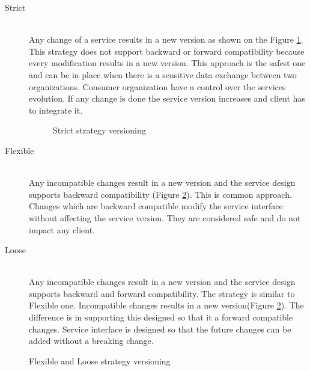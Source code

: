 \begin{description}
  \item[Strict]  \hfill \\
  Any change of a service results in a new version as shown on the Figure \ref{fig:strict-strategy}. This strategy does not support backward or forward compatibility because every modification results in a new version. This approach is the safest one and can be in place when there is a sensitive data exchange between two organizations. Consumer organization have a control over the services evolution. If any change is done the service version increases and client has to integrate it. 
    
\begin{figure}[htp] 
\caption{Strict strategy versioning}
\label{fig:strict-strategy}
\end{figure} 

  \item[Flexible] \hfill \\
  Any incompatible changes result in a new version and the service design supports backward compatibility (Figure \ref{fig:flexible-strategy}). This is common approach. Changes which are backward compatible modify the service interface without affecting the service version. They are considered safe and do not impact any client.
  \item[Loose] \hfill \\
  Any incompatible changes result in a new version and the service design supports backward and forward compatibility. The strategy is similar to Flexible one. Incompatible changes results in a new version(Figure \ref{fig:flexible-strategy}). The difference is in supporting this designed so that it a forward compatible changes. Service interface is designed so that the future changes can be added without a breaking change.
\end{description}

\begin{figure}[htp] 
\caption{Flexible and Loose strategy versioning}
\label{fig:flexible-strategy}
\end{figure} 

